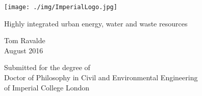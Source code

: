 \begin{titlepage}

  \texttt{[image: ./img/ImperialLogo.jpg]}\\[1cm]

    \begin{center}
        \vspace*{1cm}
        
        {\LARGE Highly integrated urban energy, water and waste resources}
        
        \vspace{1.5cm}
        
        Tom Ravalde \\
        \vspace{0.8cm}
        August 2016
        
        \vfill
        
        Submitted for the degree of \\
	Doctor of Philosophy in Civil and Environmental Engineering\\
	of Imperial College London
        
    \end{center}

\end{titlepage}
